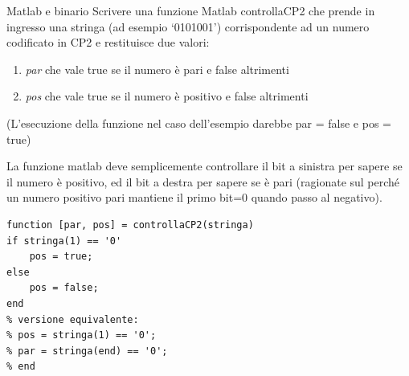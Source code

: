 \documentclass[aspectratio=169, ]{beamer}
\begin{document}
\iffalse
\begin{frame}[fragile]{Matlab e binario}
    \framebreak
    Scrivere  una  funzione  Matlab  controllaCP2  che  prende  in  ingresso  una  stringa  (ad
    esempio ‘0101001’)  corrispondente  ad  un  numero  codificato  in  CP2  e  restituisce  due
    valori:
    \begin{enumerate}
        \item \emph{par}  che  vale  true  se  il  numero  è  pari  e  false  altrimenti
        \item \emph{pos}  che  vale  true  se  il  numero  è  positivo  e  false  altrimenti
    \end{enumerate}
    (L’esecuzione  della  funzione  nel  caso  dell’esempio  darebbe  par = false  e  pos =
    true)


    \framebreak

    La funzione matlab deve semplicemente controllare il bit a sinistra per sapere se il numero è positivo, ed il bit a destra per sapere se è pari (ragionate sul perché un numero positivo pari mantiene il primo bit=0 quando passo al negativo).
    \begin{lstlisting}[style=matlab]
function [par, pos] = controllaCP2(stringa)
if stringa(1) == '0'
    pos = true;
else
    pos = false;
end
% versione equivalente:
% pos = stringa(1) == '0';
% par = stringa(end) == '0';
% end
    \end{lstlisting}


\end{frame}
\end{document}
